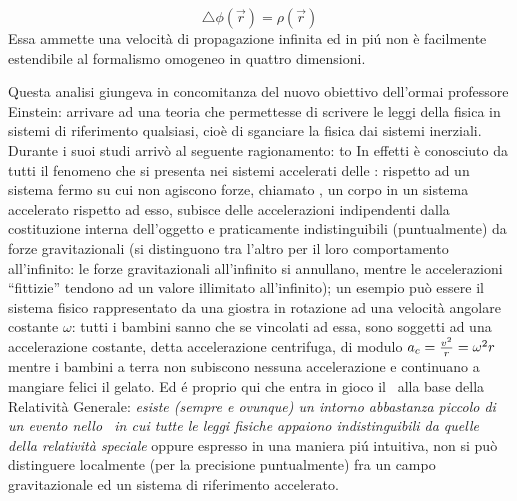 $$
\triangle\phi(\vec{r})=\rho(\vec{r})
$$
Essa ammette una velocit\`a di propagazione infinita ed in pi\'u  non \`e facilmente es\-ten\-di\-bi\-le al formalismo omogeneo in quattro dimensioni.
\par
Questa analisi giungeva in concomitanza del nuovo obiettivo dell'ormai professore Einstein: arrivare ad una teoria che permettesse di scrivere le leggi della fisica in sistemi di riferimento qualsiasi, cio\`e di sganciare la fisica dai sistemi inerziali. Durante i suoi studi arriv\`o al seguente ragionamento:
\bigskip
\hbox to \bigskip
In effetti \`e conosciuto da tutti il fenomeno che si presenta nei sistemi accelerati delle : rispetto ad un sistema {\Italic fermo} su cui non agiscono forze, chiamato , un corpo in un  sistema accelerato rispetto ad esso, subisce delle accelerazioni indipendenti dalla costituzione interna dell'oggetto e praticamente in\-distingui\-bi\-li (puntualmente) da forze gravitazionali (si distinguono tra l'altro per il loro comportamento all'infinito: le forze gravitazionali all'infinito si annullano, mentre le accelerazioni ``fittizie'' tendono ad un valore illimitato all'infinito); un esempio pu\`o essere il sistema fisico rappresentato da una giostra in rotazione ad una velocit\`a angolare costante $\omega$: tutti i bambini sanno che se vincolati ad essa, sono soggetti ad una accelerazione costante, detta accelerazione centrifuga, di modulo $a_c={v^2\over r}=\omega^2 r$ mentre i bambini a terra  non subiscono nessuna accelerazione e continuano a mangiare felici il gelato.
Ed \' e proprio qui che entra in gioco il \ alla base della Relativit\`a Generale: {\sl esiste (sempre e ovunque) un intorno abbastanza piccolo di un evento nello \ST\ in cui tutte le leggi fisiche appaiono indistinguibili da quelle della relativit\`a speciale} oppure espresso in una maniera pi\'u intuitiva, non si pu\`o distinguere localmente (per la precisione puntualmente) fra un campo gravitazionale ed un sistema di riferimento accelerato.\par
